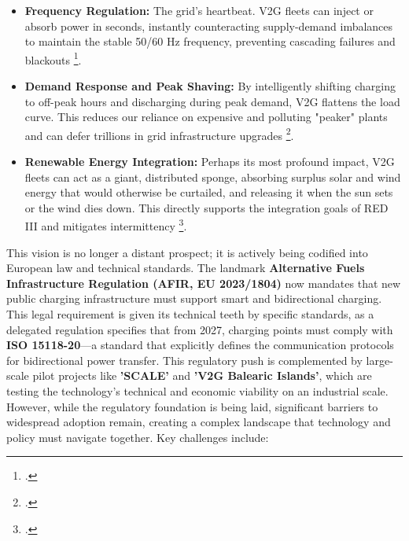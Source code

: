 \begin{itemize}
    \item \textbf{Frequency Regulation:} The grid's heartbeat. V2G fleets can inject or absorb power in seconds, instantly counteracting supply-demand imbalances to maintain the stable 50/60 Hz frequency, preventing cascading failures and blackouts \footcite{alfaverh2022optima, sadeghi2021deep}.
    
    \item \textbf{Demand Response and Peak Shaving:} By intelligently shifting charging to off-peak hours and discharging during peak demand, V2G flattens the load curve. This reduces our reliance on expensive and polluting "peaker" plants and can defer trillions in grid infrastructure upgrades \footcite{orfanoudakis2022deep}.
    
    \item \textbf{Renewable Energy Integration:} Perhaps its most profound impact, V2G fleets can act as a giant, distributed sponge, absorbing surplus solar and wind energy that would otherwise be curtailed, and releasing it when the sun sets or the wind dies down. This directly supports the integration goals of RED III and mitigates intermittency \footcite{khan2024review, zou2021deep}.
\end{itemize}
This vision is no longer a distant prospect; it is actively being codified into European law and technical standards. The landmark \textbf{Alternative Fuels Infrastructure Regulation (AFIR, EU 2023/1804)} now mandates that new public charging infrastructure must support smart and bidirectional charging. This legal requirement is given its technical teeth by specific standards, as a delegated regulation specifies that from 2027, charging points must comply with \textbf{ISO 15118-20}—a standard that explicitly defines the communication protocols for bidirectional power transfer. This regulatory push is complemented by large-scale pilot projects like \textbf{'SCALE'} and \textbf{'V2G Balearic Islands'}, which are testing the technology's technical and economic viability on an industrial scale.
\\
\noindent
However, while the regulatory foundation is being laid, significant barriers to widespread adoption remain, creating a complex landscape that technology and policy must navigate together. Key challenges include:
